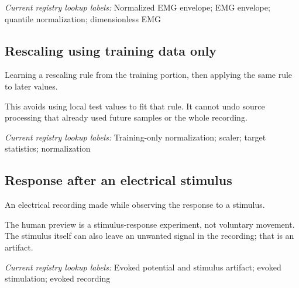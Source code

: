 \noindent\textit{Current registry lookup labels:} Normalized EMG envelope; EMG envelope; quantile normalization; dimensionless EMG\par

\begin{samepage}
\subsection*{Rescaling using training data only}
\noindent Learning a rescaling rule from the training portion, then applying the same rule to later values.\par
\end{samepage}
\begin{samepage}
\noindent This avoids using local test values to fit that rule. It cannot undo source processing that already used future samples or the whole recording.\par\nopagebreak[4]

\end{samepage}


\noindent\textit{Current registry lookup labels:} Training-only normalization; scaler; target statistics; normalization\par

\begin{samepage}
\subsection*{Response after an electrical stimulus}
\noindent An electrical recording made while observing the response to a stimulus.\par
\end{samepage}
\begin{samepage}
\noindent The human preview is a stimulus-response experiment, not voluntary movement. The stimulus itself can also leave an unwanted signal in the recording; that is an artifact.\par\nopagebreak[4]

\end{samepage}


\noindent\textit{Current registry lookup labels:} Evoked potential and stimulus artifact; evoked stimulation; evoked recording\par

